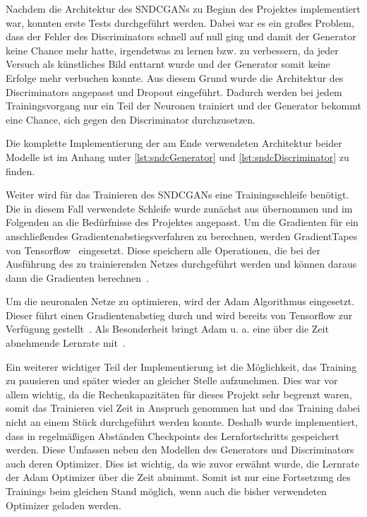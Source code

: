  Nachdem die Architektur des SNDCGANs zu Beginn des Projektes implementiert war, konnten erste Tests durchgeführt werden. Dabei war es ein großes Problem, dass der Fehler des Discriminators schnell auf null ging und damit der Generator keine Chance mehr hatte, irgendetwas zu lernen bzw. zu verbessern, da jeder Versuch als künstliches Bild enttarnt wurde und der Generator somit keine Erfolge mehr verbuchen konnte. Aus diesem Grund wurde die Architektur des Discriminators angepasst und Dropout eingeführt. Dadurch werden bei jedem Trainingsvorgang nur ein Teil der Neuronen trainiert und der Generator bekommt eine Chance, sich gegen den Discriminator durchzusetzen.
 
 Die komplette Implementierung der am Ende verwendeten Architektur beider Modelle ist im Anhang unter \autoref{lst:sndcGenerator} und \ref{lst:sndcDiscriminator} zu finden.
 
 Weiter wird für das Trainieren des SNDCGANs eine Trainingsschleife benötigt. Die in diesem Fall verwendete Schleife wurde zunächst aus \cite{raschka2019} übernommen und im Folgenden an die Bedürfnisse des Projektes angepasst. Um die Gradienten für ein anschließendes Gradientenabstiegsverfahren zu berechnen, werden GradientTapes von Tensorflow~\cite{tf:gradientape} eingesetzt. Diese speichern alle Operationen, die bei der Ausführung des zu trainierenden Netzes durchgeführt werden und können daraus dann die Gradienten berechnen~\cite{tf:autodiff}.
 
 Um die neuronalen Netze zu optimieren, wird der Adam Algorithmus eingesetzt. Dieser führt einen Gradientenabstieg durch und wird bereits von Tensorflow zur Verfügung gestellt~\cite{tf:adam}. Als Besonderheit bringt Adam u. a. eine über die Zeit abnehmende Lernrate mit~\cite{kingma2014}.
 
 Ein weiterer wichtiger Teil der Implementierung ist die Möglichkeit, das Training zu pausieren und später wieder an gleicher Stelle aufzunehmen. Dies war vor allem wichtig, da die Rechenkapazitäten für dieses Projekt sehr begrenzt waren, somit das Trainieren viel Zeit in Anspruch genommen hat und das Training dabei nicht an einem Stück durchgeführt werden konnte. Deshalb wurde implementiert, dass in regelmäßigen Abständen Checkpoints des Lernfortschritts gespeichert werden. Diese Umfassen neben den Modellen des Generators und Discriminators auch deren Optimizer. Dies ist wichtig, da wie zuvor erwähnt wurde, die Lernrate der Adam Optimizer über die Zeit abnimmt. Somit ist nur eine Fortsetzung des Trainings beim gleichen Stand möglich, wenn auch die bisher verwendeten Optimizer geladen werden. 
 
